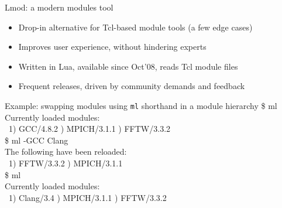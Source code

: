 \documentclass[10pt,xcolor={usenames,dvipsnames}]{beamer}
\begin{document}
\begin{frame}{Lmod: a modern modules tool}
\begin{itemize}
    \item
        Drop-in alternative for Tcl-based module tools (a few edge cases)
    \item
        Improves user experience, without hindering experts
    \item
        Written in Lua, available since Oct'08, reads Tcl module files
    \item
        Frequent releases, driven by community demands and feedback
\end{itemize}
\quad\quad
\begin{minipage}{0.9\textwidth}
    \begin{exampleblock}{Example: swapping modules using \texttt{ml} shorthand in a module hierarchy}
        \ttfamily
        \$ ml\\
        Currently loaded modules:\\
        ~1) GCC/4.8.2 ) MPICH/3.1.1 ) FFTW/3.3.2\\
        \$ ml -GCC Clang\\
        The following have been reloaded:\\
        ~1) FFTW/3.3.2 ) MPICH/3.1.1\\
        \$ ml\\
        Currently loaded modules:\\
        ~1) Clang/3.4 ) MPICH/3.1.1 ) FFTW/3.3.2
    \end{exampleblock}
\end{minipage}
\end{frame}

\end{document}
